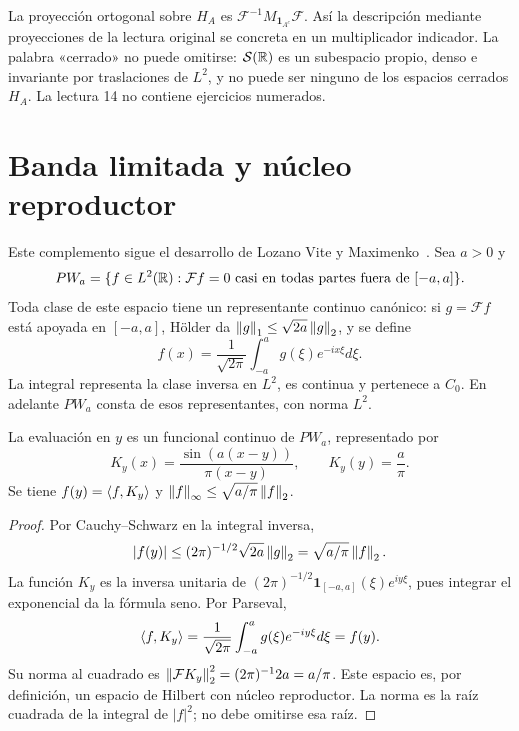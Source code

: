 La proyección ortogonal sobre $H_A$ es $\mathcal F^{-1}M_{\mathbf1_{A^c}}\mathcal F$. Así la descripción mediante proyecciones de la lectura original se concreta en un multiplicador indicador. La palabra «cerrado» no puede omitirse: $\mathcal S(\mathbb R)$ es un subespacio propio, denso e invariante por traslaciones de $L^2$, y no puede ser ninguno de los espacios cerrados $H_A$. La lectura 14 no contiene ejercicios numerados.

\section{Banda limitada y núcleo reproductor}
Este complemento sigue el desarrollo de Lozano Vite y Maximenko~\cite{lozanoMaximenkoPaleyWiener}. Sea $a>0$ y
\[
 PW_a=\{f\in L^2(\mathbb R):\mathcal Ff=0\text{ casi en todas partes fuera de }[-a,a]\}.
\]
Toda clase de este espacio tiene un representante continuo canónico: si $g=\mathcal Ff$ está apoyada en $[-a,a]$, Hölder da $\left\lVert g\right\rVert_1\leq\sqrt{2a}\left\lVert g\right\rVert_2$, y se define
\[
 f(x)=\frac1{\sqrt{2\pi}}\int_{-a}^ag(\xi)e^{-ix\xi}d\xi.
\]
La integral representa la clase inversa en $L^2$, es continua y pertenece a $C_0$. En adelante $PW_a$ consta de esos representantes, con norma $L^2$.
\begin{proposicion}\label{v4:rkhs-pw}
La evaluación en $y$ es un funcional continuo de $PW_a$, representado por
\[
 K_y(x)=\frac{\sin(a(x-y))}{\pi(x-y)},\qquad K_y(y)=\frac a\pi.
\]
Se tiene $f(y)=\left\langle f,K_y\right\rangle$ y $\left\lVert f\right\rVert_\infty\leq\sqrt{a/\pi}\left\lVert f\right\rVert_2$.
\end{proposicion}
\begin{proof}
Por Cauchy--Schwarz en la integral inversa,
\[
|f(y)|\leq(2\pi)^{-1/2}\sqrt{2a}\left\lVert g\right\rVert_2=\sqrt{a/\pi}\left\lVert f\right\rVert_2.
\]
La función $K_y$ es la inversa unitaria de $(2\pi)^{-1/2}\mathbf1_{[-a,a]}(\xi)e^{iy\xi}$, pues integrar el exponencial da la fórmula seno. Por Parseval,
\[
 \left\langle f,K_y\right\rangle=\frac1{\sqrt{2\pi}}\int_{-a}^ag(\xi)e^{-iy\xi}d\xi=f(y).
\]
Su norma al cuadrado es $\left\lVert\mathcal FK_y\right\rVert_2^2=(2\pi)^{-1}2a=a/\pi$. Este espacio es, por definición, un espacio de Hilbert con núcleo reproductor. La norma es la raíz cuadrada de la integral de $|f|^2$; no debe omitirse esa raíz.
\end{proof}

